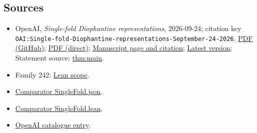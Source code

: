 \documentclass[11pt]{article}
\begin{document}
\subsection{Sources}
\begin{itemize}
\item OpenAI, \emph{Single-fold Diophantine representations}, 2026-09-24; citation key \texttt{OAI:Single-fold-Diophantine-representations-September-24-2026}. \href{https://github.com/openai/math/blob/adc7f1241b42e322a6451854ab7e4b4c146bf78a/preprints/Single-fold-Diophantine-representations-September-24-2026/paper.pdf}{PDF (GitHub)}; \href{https://github.com/openai/math/raw/adc7f1241b42e322a6451854ab7e4b4c146bf78a/preprints/Single-fold-Diophantine-representations-September-24-2026/paper.pdf}{PDF (direct)}; \href{https://github.com/openai/math/blob/adc7f1241b42e322a6451854ab7e4b4c146bf78a/preprints/Single-fold-Diophantine-representations-September-24-2026/README.md}{Manuscript page and citation}; \href{https://github.com/openai/math/blob/main/preprints/Single-fold-Diophantine-representations-September-24-2026/paper.pdf}{Latest version}; Statement source: \href{https://github.com/openai/math/blob/adc7f1241b42e322a6451854ab7e4b4c146bf78a/preprints/Single-fold-Diophantine-representations-September-24-2026/build/main.tex\#L56}{thm:main}.
\item Family 242: \href{https://github.com/openai/math/blob/adc7f1241b42e322a6451854ab7e4b4c146bf78a/lean/docs/242.md}{Lean scope}.
\item \href{https://github.com/openai/math/blob/adc7f1241b42e322a6451854ab7e4b4c146bf78a/lean/ComparatorChallenges/SingleFold.json}{Comparator SingleFold.json}.
\item \href{https://github.com/openai/math/blob/adc7f1241b42e322a6451854ab7e4b4c146bf78a/lean/ComparatorChallenges/SingleFold.lean}{Comparator SingleFold.lean}.
\item \href{https://github.com/openai/math/blob/adc7f1241b42e322a6451854ab7e4b4c146bf78a/CONTENTS.md}{OpenAI catalogue entry}.
\end{itemize}
\end{document}
